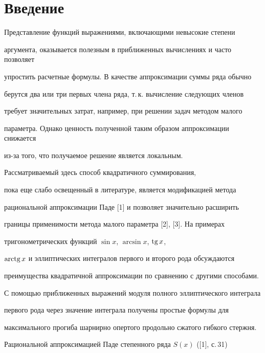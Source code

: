 \label{begin}








\section*{Введение}





Представление функций выражениями, включающими невысокие степени 


аргумента, оказывается полезным в приближенных вычислениях и часто позволяет 


упростить расчетные формулы. В качестве аппроксимации суммы ряда обычно 


берутся два или три первых члена ряда, т.\,к. вычисление следующих членов 


требует значительных затрат, например, при решении задач методом малого 


параметра. Однако ценность полученной таким образом аппроксимации снижается 


из-за того, что получаемое решение является локальным. 





Рассматриваемый здесь способ квадратичного суммирования, 


пока еще слабо освещенный в литературе, является модификацией метода 


рациональной аппроксимации Паде [1] и позволяет значительно расширить 


границы применимости метода малого параметра [2], [3]. На примерах 


тригонометрических функций $\sin x$, $\arcsin x$, $\operatorname{tg} x$, 


$\operatorname{arctg} x$ и эллиптических интегралов первого и второго рода обсуждаются 


преимущества квадратичной аппроксимации по сравнению с другими способами. 


С помощью приближенных выражений модуля полного эллиптического интеграла 


первого рода через значение интеграла получены простые формулы для 


максимального прогиба шарнирно опертого продольно сжатого гибкого стержня.  





Рациональной аппроксимацией Паде степенного ряда $S(x)$ ([1], с.\,31) 


